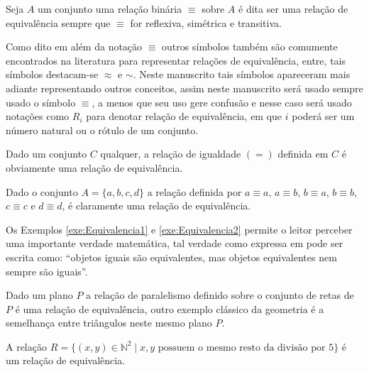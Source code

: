 \begin{definition}\label{def:RelacaoEquivalencia}
	Seja $A$ um conjunto uma relação binária $\equiv$ sobre $A$ é dita ser uma relação de equivalência sempre que $\equiv$ for reflexiva, simétrica e transitiva.
\end{definition}

\begin{remark}
	Como dito em \cite{carmo2013} além da notação $\equiv$ outros símbolos também são comumente encontrados na literatura para representar relações de equivalência, entre, tais símbolos destacam-se $\approx$ e $\sim$. Neste manuscrito tais símbolos apareceram mais adiante representando outros conceitos, assim neste manuscrito será usado sempre usado o símbolo $\equiv$, a menos que seu uso gere confusão e nesse caso será usado notações como $R_i$ para denotar relação de equivalência, em que $i$ poderá ser um número natural ou o rótulo de um conjunto.
\end{remark}

\begin{example}\label{exe:Equivalencia1}
	Dado um conjunto $C$ qualquer, a relação de igualdade $(=)$ definida em $C$ é obviamente uma relação de equivalência.
\end{example}

\begin{example}\label{exe:Equivalencia2}
	Dado o conjunto $A =\{a, b, c, d\}$ a relação definida por $a \equiv a$, $a \equiv b$, $b \equiv a$, $b \equiv b$, $c \equiv c$ e $d \equiv d$, é claramente uma relação de equivalência.
\end{example}

Os Exemplos \ref{exe:Equivalencia1} e \ref{exe:Equivalencia2} permite o leitor perceber uma importante verdade matemática, tal verdade como expressa em \cite{carmo2013} pode ser escrita como: ``objetos iguais são equivalentes, mas objetos equivalentes nem sempre são iguais''.

\begin{example}
	Dado um plano $P$ a relação de paralelismo definido sobre o conjunto de retas de $P$ é uma relação de equivalência, outro exemplo clássico da geometria é a semelhança entre triângulos neste mesmo plano $P$.
\end{example}

\begin{example}
	A relação $R = \{(x, y) \in \mathbb{N}^2 \mid x, y \text{ possuem o mesmo resto da divisão por } 5\}$ é um relação de equivalência.
\end{example}


